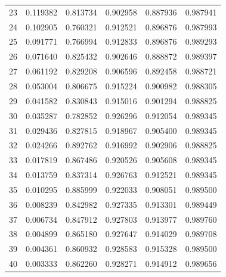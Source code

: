 \begin{table}[ht]
{\begin{tabular}{c c c c c c}
23 & 0.119382 & 0.813734 & 0.902958 & 0.887936 & 0.987941 \\
24 & 0.102905 & 0.760321 & 0.912521 & 0.896876 & 0.987993 \\
25 & 0.091771 & 0.766994 & 0.912833 & 0.896876 & 0.989293 \\
26 & 0.071640 & 0.825432 & 0.902646 & 0.888872 & 0.989397 \\
27 & 0.061192 & 0.829208 & 0.906596 & 0.892458 & 0.988721 \\
28 & 0.053004 & 0.806675 & 0.915224 & 0.900982 & 0.988305 \\
29 & 0.041582 & 0.830843 & 0.915016 & 0.901294 & 0.988825 \\
30 & 0.035287 & 0.782852 & 0.926296 & 0.912054 & 0.989345 \\
31 & 0.029436 & 0.827815 & 0.918967 & 0.905400 & 0.989345 \\
32 & 0.024266 & 0.892762 & 0.916992 & 0.902906 & 0.988825 \\
33 & 0.017819 & 0.867486 & 0.920526 & 0.905608 & 0.989345 \\
34 & 0.013759 & 0.837314 & 0.926763 & 0.912521 & 0.989345 \\
35 & 0.010295 & 0.885999 & 0.922033 & 0.908051 & 0.989500 \\
36 & 0.008239 & 0.842982 & 0.927335 & 0.913301 & 0.989449 \\
37 & 0.006734 & 0.847912 & 0.927803 & 0.913977 & 0.989760 \\
38 & 0.004899 & 0.865180 & 0.927647 & 0.914029 & 0.989708 \\
39 & 0.004361 & 0.860932 & 0.928583 & 0.915328 & 0.989500 \\
40 & 0.003333 & 0.862260 & 0.928271 & 0.914912 & 0.989656 \\
\hline
\end{tabular}
}
\end{table}


